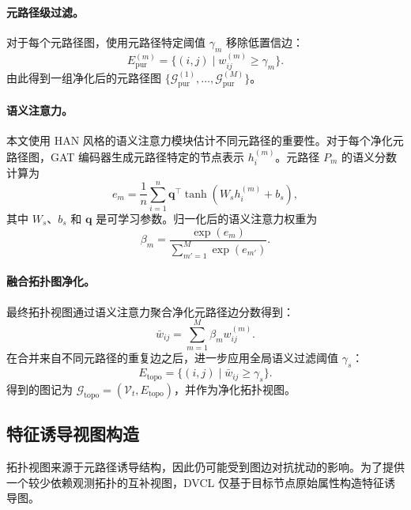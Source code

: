 \paragraph{元路径级过滤。}
对于每个元路径图，使用元路径特定阈值 $\gamma_m$ 移除低置信边：
\begin{equation}
E^{(m)}_{\mathrm{pur}}
=
\{(i,j)\mid w_{ij}^{(m)} \geq \gamma_m\}.
\end{equation}
由此得到一组净化后的元路径图
$\{\mathcal{G}^{(1)}_{\mathrm{pur}},\ldots,\mathcal{G}^{(M)}_{\mathrm{pur}}\}$。

\paragraph{语义注意力。}
本文使用 HAN 风格的语义注意力模块估计不同元路径的重要性。对于每个净化元路径图，GAT 编码器生成元路径特定的节点表示 $h_i^{(m)}$。元路径 $P_m$ 的语义分数计算为
\begin{equation}
e_m
=
\frac{1}{n}
\sum_{i=1}^{n}
\mathbf{q}^{\top}
\tanh(W_s h_i^{(m)} + b_s),
\end{equation}
其中 $W_s$、$b_s$ 和 $\mathbf{q}$ 是可学习参数。归一化后的语义注意力权重为
\begin{equation}
\beta_m
=
\frac{\exp(e_m)}
{\sum_{m'=1}^{M}\exp(e_{m'})}.
\end{equation}

\paragraph{融合拓扑图净化。}
最终拓扑视图通过语义注意力聚合净化元路径边分数得到：
\begin{equation}
\bar{w}_{ij}
=
\sum_{m=1}^{M}
\beta_m w_{ij}^{(m)}.
\end{equation}
在合并来自不同元路径的重复边之后，进一步应用全局语义过滤阈值 $\gamma_s$：
\begin{equation}
E_{\mathrm{topo}}
=
\{(i,j)\mid \bar{w}_{ij}\geq \gamma_s\}.
\end{equation}
得到的图记为
$\mathcal{G}_{\mathrm{topo}}=(\mathcal{V}_t,E_{\mathrm{topo}})$，并作为净化拓扑视图。

\subsection{特征诱导视图构造}

拓扑视图来源于元路径诱导结构，因此仍可能受到图边对抗扰动的影响。为了提供一个较少依赖观测拓扑的互补视图，DVCL 仅基于目标节点原始属性构造特征诱导图。

